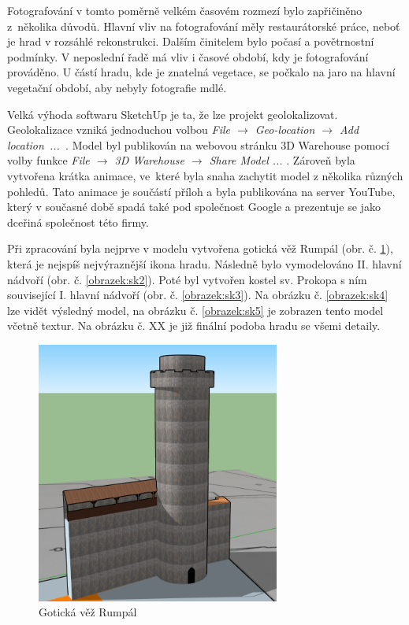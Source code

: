 \documentclass[thesis=M,czech]{FITthesis}[2012/06/26]
\begin{document}
Fotografování v tomto poměrně velkém časovém rozmezí bylo zapřičiněno z~několika důvodů. Hlavní vliv na fotografování měly restaurátorské práce, neboť je hrad v rozsáhlé rekonstrukci. Dalším činitelem bylo počasí a povětrnostní podmínky. V neposlední řadě má vliv i časové období, kdy je fotografování prováděno. U částí hradu, kde je znatelná vegetace, se počkalo na jaro na hlavní vegetační období, aby nebyly fotografie mdlé.

Velká výhoda softwaru SketchUp je ta, že lze projekt geolokalizovat. Geolokalizace vzniká jednoduchou volbou \textit{File $\rightarrow$ Geo-location $\rightarrow$ Add \mbox{location ... }}. Model byl publikován na webovou stránku 3D Warehouse pomocí volby funkce \textit{File $\rightarrow$ 3D Warehouse $\rightarrow$ Share Model ... }. Zároveň byla vytvořena krátka animace, ve~které byla snaha zachytit model z několika různých pohledů. Tato animace je součástí příloh a byla publikována na server YouTube, který v současné době spadá také pod společnost Google a prezentuje se jako dceřiná společnost této firmy. 

Při zpracování byla nejprve v modelu vytvořena gotická věž Rumpál (obr. č. \ref{obrazek:sk1}), která je nejspíš nejvýraznější ikona hradu. Následně bylo vymodelováno II. hlavní nádvoří (obr. č. \ref{obrazek:sk2}). Poté byl vytvořen kostel sv. Prokopa s ním související I. hlavní nádvoří (obr. č. \ref{obrazek:sk3}). Na obrázku č. \ref{obrazek:sk4} lze vidět výsledný model, na obrázku č. \ref{obrazek:sk5} je zobrazen tento model včetně textur. Na obrázku č. XX je již finální podoba hradu se všemi detaily.

\begin{figure}[h]
	\centering
	\includegraphics[width=8cm]{pics/sketchup1.png}
	\caption{Gotická věž Rumpál}
	\label{obrazek:sk1}
\end{figure}
\end{document}
